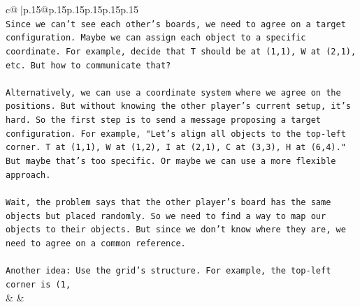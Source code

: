 \documentclass{article}
\begin{document}
{\begin{supertabular}{c@{$\;$}|p{.15\linewidth}@{}p{.15\linewidth}p{.15\linewidth}p{.15\linewidth}p{.15\linewidth}p{.15\linewidth}}
{{{\\ 
\texttt{Since we can't see each other's boards, we need to agree on a target configuration. Maybe we can assign each object to a specific coordinate. For example, decide that T should be at (1,1), W at (2,1), etc. But how to communicate that?} \\
\\ 
\texttt{Alternatively, we can use a coordinate system where we agree on the positions. But without knowing the other player's current setup, it's hard. So the first step is to send a message proposing a target configuration. For example, "Let's align all objects to the top{-}left corner. T at (1,1), W at (1,2), I at (2,1), C at (3,3), H at (6,4)." But maybe that's too specific. Or maybe we can use a more flexible approach.} \\
\\ 
\texttt{Wait, the problem says that the other player's board has the same objects but placed randomly. So we need to find a way to map our objects to their objects. But since we don't know where they are, we need to agree on a common reference.} \\
\\ 
\texttt{Another idea: Use the grid's structure. For example, the top{-}left corner is (1,} \\
            }
        }
    }
    & & \\ \\


\end{supertabular}}
\end{document}

